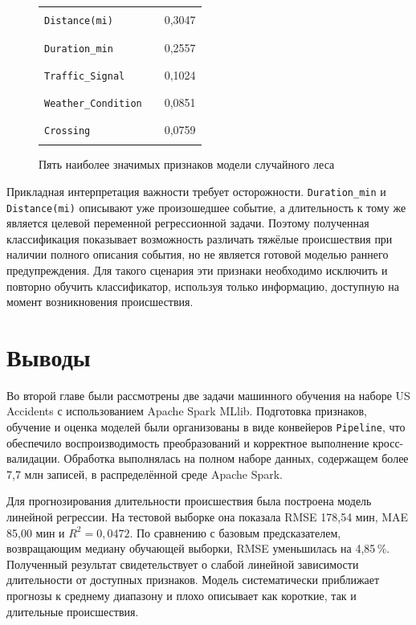 \begin{figure}[H]
    \centering
    \begin{tabular}{p{}p{}r}
        \texttt{Distance(mi)} & \rule{0.3047\textwidth}{0.45em} & 0,3047 \\
        \texttt{Duration\_min} & \rule{0.2557\textwidth}{0.45em} & 0,2557 \\
        \texttt{Traffic\_Signal} & \rule{0.1024\textwidth}{0.45em} & 0,1024 \\
        \texttt{Weather\_Condition} & \rule{0.0851\textwidth}{0.45em} & 0,0851 \\
        \texttt{Crossing} & \rule{0.0759\textwidth}{0.45em} & 0,0759
    \end{tabular}
    \caption{Пять наиболее значимых признаков модели случайного леса}
    \label{fig:rf-feature-importance}
\end{figure}

Прикладная интерпретация важности требует осторожности. \texttt{Duration\_min} и \texttt{Distance(mi)} описывают уже произошедшее событие, а длительность к тому же является целевой переменной регрессионной задачи. Поэтому полученная классификация показывает возможность различать тяжёлые происшествия при наличии полного описания события, но не является готовой моделью раннего предупреждения. Для такого сценария эти признаки необходимо исключить и повторно обучить классификатор, используя только информацию, доступную на момент возникновения происшествия.

\vspace{\baselineskip}\section{Выводы}
\vspace{\baselineskip}

Во второй главе были рассмотрены две задачи машинного обучения на наборе US Accidents с использованием Apache Spark MLlib. Подготовка признаков, обучение и оценка моделей были организованы в виде конвейеров \texttt{Pipeline}, что обеспечило воспроизводимость преобразований и корректное выполнение кросс-валидации. Обработка выполнялась на полном наборе данных, содержащем более 7,7 млн записей, в распределённой среде Apache Spark.

Для прогнозирования длительности происшествия была построена модель линейной регрессии. На тестовой выборке она показала RMSE 178,54 мин, MAE 85,00 мин и $R^2 = 0,0472$. По сравнению с базовым предсказателем, возвращающим медиану обучающей выборки, RMSE уменьшилась на 4,85\,\%. Полученный результат свидетельствует о слабой линейной зависимости длительности от доступных признаков. Модель систематически приближает прогнозы к среднему диапазону и плохо описывает как короткие, так и длительные происшествия.

